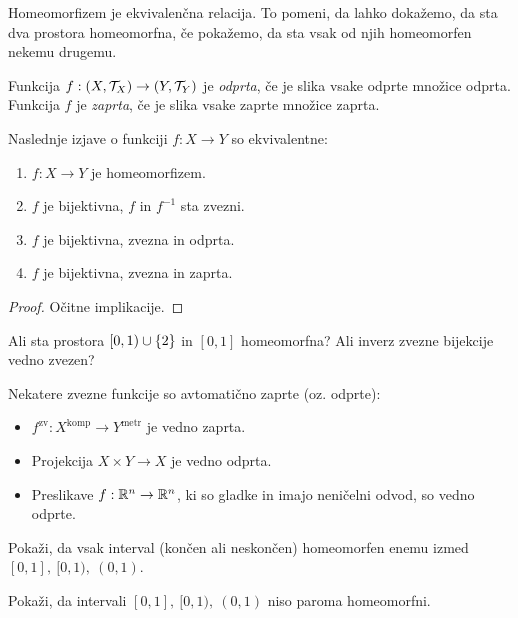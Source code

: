 \begin{opomba}
    Homeomorfizem je ekvivalenčna relacija. To pomeni, da lahko dokažemo, da sta dva prostora homeomorfna, če pokažemo, da sta vsak od njih homeomorfen nekemu drugemu.
\end{opomba}

\begin{definicija}
    Funkcija $f: (X, \mathcal{T}_X) \to (Y, \mathcal{T}_Y)$ je \emph{odprta}, če je slika vsake odprte množice odprta. Funkcija $f$ je \emph{zaprta}, če je slika vsake zaprte množice zaprta.
\end{definicija}

\begin{trditev}
    Naslednje izjave o funkciji $f: X \to Y$ so ekvivalentne:
    \begin{enumerate}
        \item $f: X \to Y$ je homeomorfizem.
        \item $f$ je bijektivna, $f$ in $f^{-1}$ sta zvezni.
        \item $f$ je bijektivna, zvezna in odprta.
        \item $f$ je bijektivna, zvezna in zaprta.
    \end{enumerate}
\end{trditev}

\begin{proof}
    Očitne implikacije.
\end{proof}

\begin{primer} 
    Ali sta prostora $[0, 1) \cup \left\{2\right\}$ in $[0,1]$ homeomorfna? Ali inverz zvezne bijekcije vedno zvezen?
\end{primer}

\newpage
\begin{trditev}
    Nekatere zvezne funkcije so avtomatično zaprte (oz. odprte):
    \begin{itemize}
        \item $f^{\text{zv}}: X^{\text{komp}} \to Y^{\text{metr}}$ je vedno zaprta.
        \item Projekcija $X \times Y \to X$ je vedno odprta.
        \item Preslikave $f: \mathbb{R}^n \to \mathbb{R}^n$, ki so gladke in imajo neničelni odvod, so vedno odprte.
    \end{itemize}
\end{trditev}

\begin{primer}
    Pokaži, da vsak interval (končen ali neskončen) homeomorfen enemu izmed $[0,1], \ [0, 1), \ (0,1)$.

    Pokaži, da intervali $[0,1], \ [0, 1), \ (0,1)$ niso paroma homeomorfni.
\end{primer}

